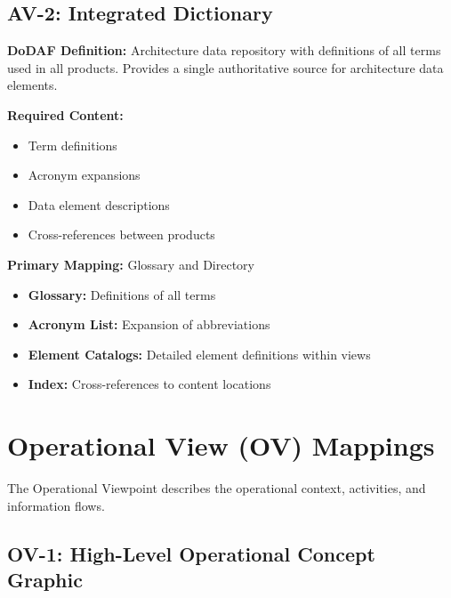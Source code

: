 \documentclass[11pt]{article}
\begin{document}
\subsection{AV-2: Integrated Dictionary}

\begin{dodafbox}
\textbf{DoDAF Definition:} Architecture data repository with definitions of all terms used in all products. Provides a single authoritative source for architecture data elements.

\textbf{Required Content:}
\begin{itemize}[nosep]
    \item Term definitions
    \item Acronym expansions
    \item Data element descriptions
    \item Cross-references between products
\end{itemize}
\end{dodafbox}

\begin{vbbox}
\textbf{Primary Mapping:} Glossary and Directory

\begin{itemize}
    \item \textbf{Glossary:} Definitions of all terms
    \item \textbf{Acronym List:} Expansion of abbreviations
    \item \textbf{Element Catalogs:} Detailed element definitions within views
    \item \textbf{Index:} Cross-references to content locations
\end{itemize}
\end{vbbox}

\section{Operational View (OV) Mappings}

The Operational Viewpoint describes the operational context, activities, and information flows.

\subsection{OV-1: High-Level Operational Concept Graphic}
\end{document}
